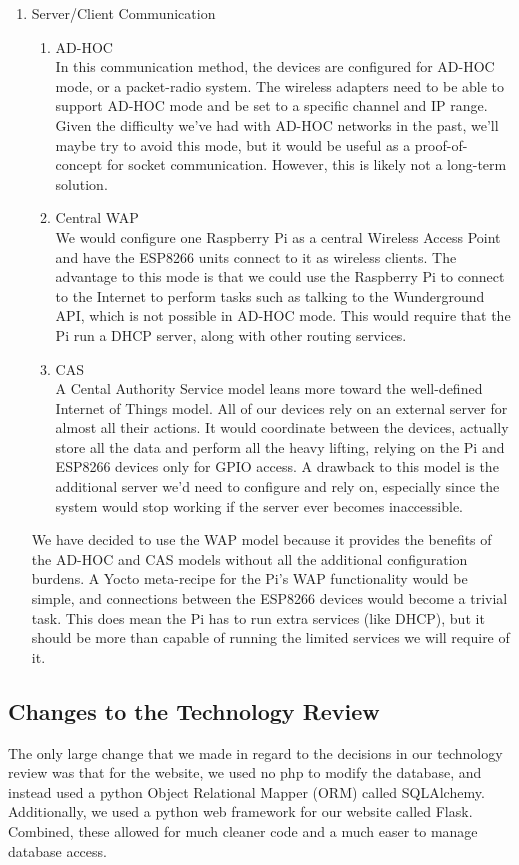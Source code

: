 \begin{enumerate}
    \item Server/Client Communication
        \begin{enumerate}
            \item AD-HOC \\
            In this communication method, the devices are configured for AD-HOC mode, or a packet-radio system. The wireless adapters need to be able to support AD-HOC mode and be set to a specific channel and IP range. Given the difficulty we've had with AD-HOC networks in the past, we'll maybe try to avoid this mode, but it would be useful as a proof-of-concept for socket communication. However, this is likely not a long-term solution.
            \item Central WAP \\
            We would configure one Raspberry Pi as a central Wireless Access Point and have the ESP8266 units connect to it as wireless clients. The advantage to this mode is that we could use the Raspberry Pi to connect to the Internet to perform tasks such as talking to the Wunderground API, which is not possible in AD-HOC mode. This would require that the Pi run a DHCP server, along with other routing services.
            \item CAS \\
            A Cental Authority Service model leans more toward the well-defined Internet of Things model. All of our devices rely on an external server for almost all their actions. It would coordinate between the devices, actually store all the data and perform all the heavy lifting, relying on the Pi and ESP8266 devices only for GPIO access. A drawback to this model is the additional server we'd need to configure and rely on, especially since the system would stop working if the server ever becomes inaccessible.
        \end{enumerate}
        We have decided to use the WAP model because it provides the benefits of the AD-HOC and CAS models without all the additional configuration burdens. A Yocto meta-recipe for the Pi's WAP functionality would be simple, and connections between the ESP8266 devices would become a trivial task. This does mean the Pi has to run extra services (like DHCP), but it should be more than capable of running the limited services we will require of it.
\end{enumerate}

\subsection{Changes to the Technology Review}

The only large change that we made in regard to the decisions in our technology review was that for the website, we used no php to modify the database, and instead used a python Object Relational Mapper (ORM) called SQLAlchemy. Additionally, we used a python web framework for our website called Flask. Combined, these allowed for much cleaner code and a much easer to manage database access.